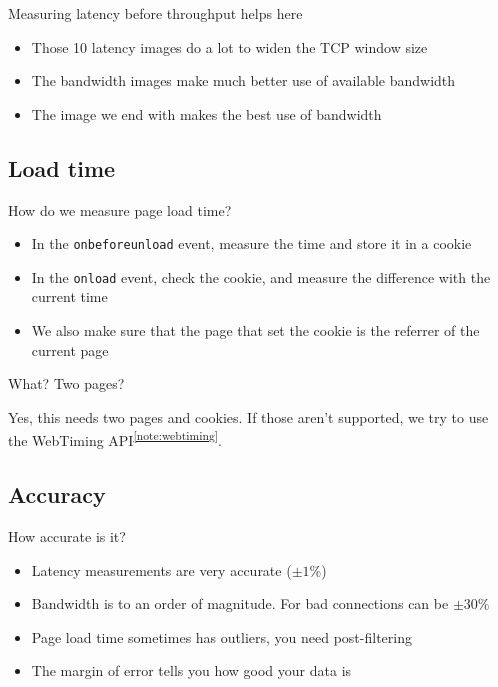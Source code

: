 \documentclass{beamer}
\begin{document}
\begin{frame}{Measuring latency before throughput helps here}
  \begin{itemize}
  \item Those 10 latency images do a lot to widen the TCP window size
  \item The bandwidth images make much better use of available bandwidth
  \item The image we end with makes the best use of bandwidth
  \end{itemize}
\end{frame}

\subsection{Load time}
\begin{frame}{How do we measure page load time?}
  \begin{itemize}
  \item In the \texttt{onbeforeunload} event, measure the time and store it in a cookie
  \item In the \texttt{onload} event, check the cookie, and measure the difference with the current time
  \item We also make sure that the page that set the cookie is the referrer of the current page
  \end{itemize}
\end{frame}

\begin{frame}{What? Two pages?}
  \begin{center}
  Yes, this needs two pages and cookies.  If those aren't supported, we try to use the WebTiming API\textsuperscript{\ref{note:webtiming}}.
  \end{center}
\end{frame}

\subsection{Accuracy}
\begin{frame}{How accurate is it?}
  \begin{itemize}
  \item Latency measurements are very accurate (\(\pm 1\%\))
  \item Bandwidth is to an order of magnitude. For bad connections can be \(\pm 30\%\)
  \item Page load time sometimes has outliers, you need post-filtering
  \item The margin of error tells you how good your data is
  \end{itemize}
\end{frame}
\end{document}
